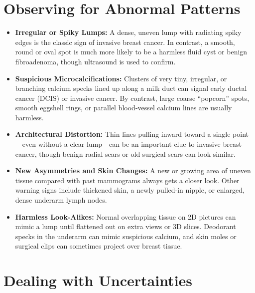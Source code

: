 \section{Observing for Abnormal Patterns}

\begin{itemize}
    \item \textbf{Irregular or Spiky Lumps:} A dense, uneven lump with radiating spiky edges is the classic sign of invasive breast cancer. In contrast, a smooth, round or oval spot is much more likely to be a harmless fluid cyst or benign fibroadenoma, though ultrasound is used to confirm.
    \item \textbf{Suspicious Microcalcifications:} Clusters of very tiny, irregular, or branching calcium specks lined up along a milk duct can signal early ductal cancer (DCIS) or invasive cancer. By contrast, large coarse ``popcorn'' spots, smooth eggshell rings, or parallel blood-vessel calcium lines are usually harmless.
    \item \textbf{Architectural Distortion:} Thin lines pulling inward toward a single point---even without a clear lump---can be an important clue to invasive breast cancer, though benign radial scars or old surgical scars can look similar.
    \item \textbf{New Asymmetries and Skin Changes:} A new or growing area of uneven tissue compared with past mammograms always gets a closer look. Other warning signs include thickened skin, a newly pulled-in nipple, or enlarged, dense underarm lymph nodes.
    \item \textbf{Harmless Look-Alikes:} Normal overlapping tissue on 2D pictures can mimic a lump until flattened out on extra views or 3D slices. Deodorant specks in the underarm can mimic suspicious calcium, and skin moles or surgical clips can sometimes project over breast tissue.
\end{itemize}

\section{Dealing with Uncertainties}

